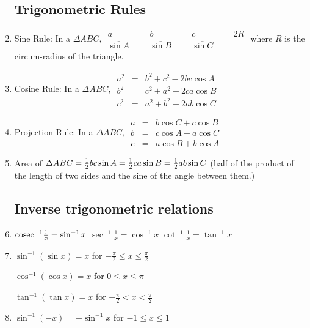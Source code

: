 \documentclass[a4paper]{article}
\begin{document}
\begin{enumerate}
\subsection{Trigonometric Rules}

\item
Sine Rule: In a $\Delta ABC$,
$\begin{array}{ccccccc}
a & = & b & = & c & = & 2R \\
\overline{\sin A} & & \overline{\sin B} & & \overline{\sin C} & &
\end{array}$
where $R$ is the circum-radius of the triangle.

\item
Cosine Rule: In a $\Delta ABC$,
$\begin{array}{rcl}
a^2 &=& b^2 + c^2 -2bc\cos A \\
b^2 &=& c^2 + a^2 -2ca\cos B \\
c^2 &=& a^2 + b^2 -2ab\cos C
\end{array}$

\item
Projection Rule: In a $\Delta ABC$,
$\begin{array}{rcl}
a &=& b\cos C + c\cos B \\
b &=& c\cos A + a\cos C \\
c &=& a\cos B + b\cos A
\end{array}$

\item
Area of $\Delta ABC = 
\frac{1}{2} bc \sin A =
\frac{1}{2} ca \sin B =
\frac{1}{2} ab \sin C$
(half of the product of the length of two sides and the sine of the angle between them.)

\subsection{Inverse trigonometric relations}

\item
$\mathrm{cosec}^{-1}\frac{1}{x} = \sin ^{-1} x$
\qquad
$\sec^{-1}\frac{1}{x} = \cos ^{-1} x$
\qquad
$\cot^{-1}\frac{1}{x} = \tan ^{-1} x$

\item
$\sin^{-1}(\sin x) = x$ for $-\frac{\pi}{2} \le x \le \frac{\pi}{2}$

$\cos^{-1}(\cos x) = x$ for $0 \le x \le \pi$

$\tan^{-1}(\tan x) = x$ for $-\frac{\pi}{2} < x < \frac{\pi}{2}$

\item
$\sin^{-1}(-x) = -\sin^{-1}x$ for $-1 \le x \le 1$


\end{enumerate}
\end{document}
